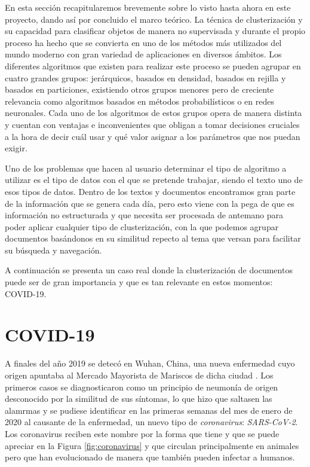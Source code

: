 \documentclass[10pt, a4paper]{article}
\begin{document}
En esta sección recapitularemos brevemente sobre lo visto hasta ahora en este proyecto, dando así por concluido el marco teórico. La técnica de clusterización y su capacidad para clasificar objetos de manera no supervisada y durante el propio proceso ha hecho que se convierta en uno de los métodos más utilizados del mundo moderno con gran variedad de aplicaciones en diversos ámbitos. Los diferentes algoritmos que existen para realizar este proceso se pueden agrupar en cuatro grandes grupos: jerárquicos, basados en densidad, basados en rejilla y basados en particiones, existiendo otros grupos menores pero de creciente relevancia como algoritmos basados en métodos probabilísticos o en redes neuronales. Cada uno de los algoritmos de estos grupos opera de manera distinta y cuentan con ventajas e inconvenientes que obligan a tomar decisiones cruciales a la hora de decir cuál usar y qué valor asignar a los parámetros que nos puedan exigir. 

Uno de los problemas que hacen al usuario determinar el tipo de algoritmo a utilizar es el tipo de datos con el que se pretende trabajar, siendo el texto uno de esos tipos de datos. Dentro de los textos y documentos encontramos gran parte de la información que se genera cada día, pero esto viene con la pega de que es información no estructurada y que necesita ser procesada de antemano para poder aplicar cualquier tipo de clusterización, con la que podemos agrupar documentos basándonos en su similitud repecto al tema que versan para facilitar su búsqueda y navegación.

A continuación se presenta un caso real donde la clusterización de documentos puede ser de gran importancia y que es tan relevante en estos momentos: COVID-19. 

 
 
 
\section{COVID-19}

A finales del año 2019 se detecó en Wuhan, China, una nueva enfermedad cuyo origen apuntaba al Mercado Mayorista de Mariscos de dicha ciudad \cite{oms}. Los primeros casos se diagnosticaron como un principio de neumonía de origen desconocido por la similitud de sus síntomas, lo que hizo que saltasen las alamrmas y se pudiese identificar en las primeras semanas del mes de enero de 2020 al causante de la enfermedad, un nuevo tipo de \textit{coronavirus}: \textit{SARS-CoV-2}. Los coronavirus reciben este nombre por la forma que tiene  y que se puede apreciar en la Figura \ref{fig:coronavirus} y que circulan principalmente en animales pero que han evolucionado de manera que también pueden infectar a humanos.   
\end{document}
